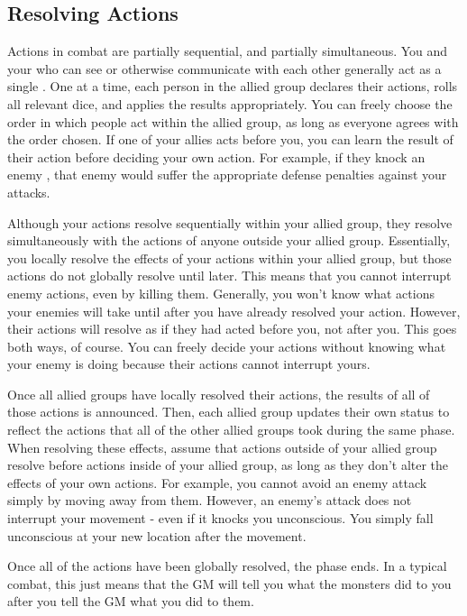   \subsection{Resolving Actions}\label{Resolving Actions}

    Actions in combat are partially sequential, and partially simultaneous.
    You and your  who can see or otherwise communicate with each other generally act as a single .
    One at a time, each person in the allied group declares their actions, rolls all relevant dice, and applies the results appropriately.
    You can freely choose the order in which people act within the allied group, as long as everyone agrees with the order chosen.
    If one of your allies acts before you, you can learn the result of their action before deciding your own action.
    For example, if they knock an enemy \prone, that enemy would suffer the appropriate defense penalties against your attacks.

    Although your actions resolve sequentially within your allied group, they resolve simultaneously with the actions of anyone outside your allied group.
    Essentially, you locally resolve the effects of your actions within your allied group, but those actions do not globally resolve until later.
    This means that you cannot interrupt enemy actions, even by killing them.
    Generally, you won't know what actions your enemies will take until after you have already resolved your action.
    However, their actions will resolve as if they had acted before you, not after you.
    This goes both ways, of course.
    You can freely decide your actions without knowing what your enemy is doing because their actions cannot interrupt yours.

    Once all allied groups have locally resolved their actions, the results of all of those actions is announced.
    Then, each allied group updates their own status to reflect the actions that all of the other allied groups took during the same phase.
    When resolving these effects, assume that actions outside of your allied group resolve before actions inside of your allied group, as long as they don't alter the effects of your own actions.
    For example, you cannot avoid an enemy attack simply by moving away from them.
    However, an enemy's attack does not interrupt your movement - even if it knocks you unconscious.
    You simply fall unconscious at your new location after the movement.

    Once all of the actions have been globally resolved, the phase ends.
    In a typical combat, this just means that the GM will tell you what the monsters did to you after you tell the GM what you did to them.

